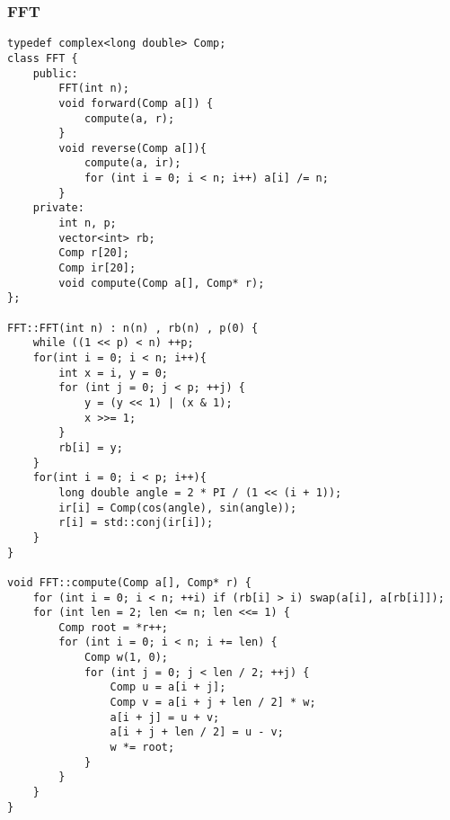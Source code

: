 \subsubsection{FFT}
\begin{verbatim}
typedef complex<long double> Comp;
class FFT {
    public:
        FFT(int n);
        void forward(Comp a[]) {
            compute(a, r);
        }
        void reverse(Comp a[]){
            compute(a, ir);
            for (int i = 0; i < n; i++) a[i] /= n;
        }
    private:
        int n, p;
        vector<int> rb;
        Comp r[20];
        Comp ir[20];
        void compute(Comp a[], Comp* r);
};

FFT::FFT(int n) : n(n) , rb(n) , p(0) {
    while ((1 << p) < n) ++p;
    for(int i = 0; i < n; i++){
        int x = i, y = 0;
        for (int j = 0; j < p; ++j) {
            y = (y << 1) | (x & 1);
            x >>= 1;
        }
        rb[i] = y;
    }
    for(int i = 0; i < p; i++){
        long double angle = 2 * PI / (1 << (i + 1));
        ir[i] = Comp(cos(angle), sin(angle));
        r[i] = std::conj(ir[i]);
    }
}

void FFT::compute(Comp a[], Comp* r) {
    for (int i = 0; i < n; ++i) if (rb[i] > i) swap(a[i], a[rb[i]]);
    for (int len = 2; len <= n; len <<= 1) {
        Comp root = *r++;
        for (int i = 0; i < n; i += len) {
            Comp w(1, 0);
            for (int j = 0; j < len / 2; ++j) {
                Comp u = a[i + j];
                Comp v = a[i + j + len / 2] * w;
                a[i + j] = u + v;
                a[i + j + len / 2] = u - v;
                w *= root;
            }
        }
    }
}
\end{verbatim}
